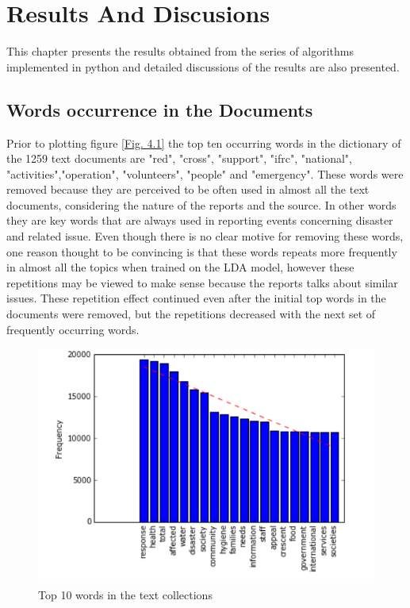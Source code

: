 \chapter{Results And Discusions}
This chapter presents the results obtained from the series of algorithms implemented in python and detailed discussions of the results are also presented. 
\section{Words occurrence in the Documents}
Prior to plotting figure \eqref{Fig. 4.1} the top ten occurring words in the dictionary of the 1259 text documents are "red", "cross",  "support", "ifrc", "national", "activities","operation", "volunteers", "people" and "emergency". These words were removed because they are perceived  to be often used in almost all the text documents, considering the nature of the reports and the source. In other words they are key words that are always used in reporting events concerning disaster and  related issue. Even though there is no clear motive for removing these words, one reason thought to be convincing is that these words repeats more frequently in almost all the topics when trained on  the LDA model, however these repetitions may be viewed to make sense because the reports talks about similar issues. These repetition effect continued even after the initial top words in the documents were removed, but  the repetitions decreased with the next set of frequently occurring words.
\begin{figure}[hbtp]
\centering
\includegraphics[scale=0.80]{c4_1.png}
\caption{Top 10 words  in the text collections}\label{Fig. 4.1}
\end{figure}
 
